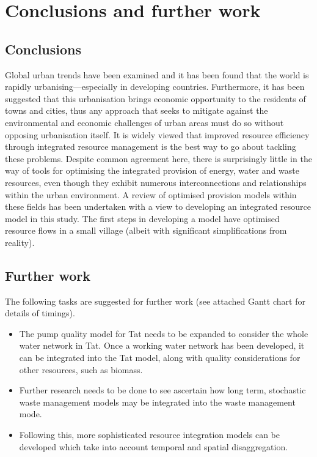 \section{Conclusions and further work}
\label{sec:conc}

\subsection{Conclusions}
Global urban trends have been examined and it has been found that the world is rapidly urbanising---especially in developing countries. Furthermore, it has been suggested that this urbanisation brings economic opportunity to the residents of towns and cities, thus any approach that seeks to mitigate against the environmental and economic challenges of urban areas must do so without opposing urbanisation itself. It is widely viewed that improved resource efficiency through integrated resource management is the best way to go about tackling these problems. Despite common agreement here, there is surprisingly little in the way of tools for optimising the integrated provision of energy, water and waste resources, even though they exhibit numerous interconnections and relationships within the urban environment. A review of optimised provision models within these fields has been undertaken with a view to developing an integrated resource model in this study. The first steps in developing a model have optimised resource flows in a small village (albeit with significant simplifications from reality). 

\subsection{Further work}
The following tasks are suggested for further work (see attached Gantt chart for details of timings).
\begin{itemize}
	\item The pump quality model for Tat needs to be expanded to consider the whole water network in Tat. Once a working water network has been developed, it can be integrated into the Tat model, along with quality considerations for other resources, such as biomass. 
	\item Further research needs to be done to see ascertain how long term, stochastic waste management models may be integrated into the waste management mode.
	\item Following this, more sophisticated resource integration models can be developed which take into account temporal and spatial disaggregation.
\end{itemize}

